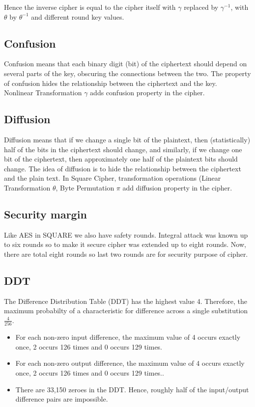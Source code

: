 \documentclass[preprint]{transcrypto}
\begin{document}
Hence the inverse cipher is equal to the cipher itself with $\gamma$ replaced by $\gamma^{-1}$, with $\theta$ by $\theta^{-1}$ and different round key values.

\subsection{Confusion}
Confusion means that each binary digit (bit) of the ciphertext should depend on several parts of the key, obscuring the connections between the two.
The property of confusion hides the relationship between the ciphertext and the key.\\
Nonlinear Transformation $\gamma$ adds confusion property in the cipher.

\subsection{Diffusion}
Diffusion means that if we change a single bit of the plaintext, then (statistically) half of the bits in the ciphertext should change, and similarly, if we change one bit of the ciphertext, then approximately one half of the plaintext bits should change.
The idea of diffusion is to hide the relationship between the ciphertext and the plain text.
In Square Cipher, transformation operations (Linear Transformation $\theta$, Byte Permutation $\pi$ add diffusion property in the cipher.

\subsection{Security margin}
Like AES in SQUARE we also have safety rounds. Integral attack was known up to six rounds so to make it secure cipher was extended up to eight rounds. Now, there are total eight rounds so last two rounds are for security purpose of cipher.

\subsection{DDT}
The Difference Distribution Table (DDT) has the highest value 4. Therefore, the maximum probabilty of a characteristic for difference across a single substitution $\frac{4}{256}$.

\begin{itemize}
  \item For each non-zero input difference, the maximum value of 4 occurs exactly once, 2 occurs 126 times and 0 occurs 129 times.
  \item For each non-zero output difference, the maximum value of 4 occurs exactly once, 2 occurs 126 times and 0 occurs 129 times..
  \item There are 33,150 zeroes in the DDT. Hence, roughly half of the input/output difference pairs are impossible.
\end{itemize}
\end{document}
